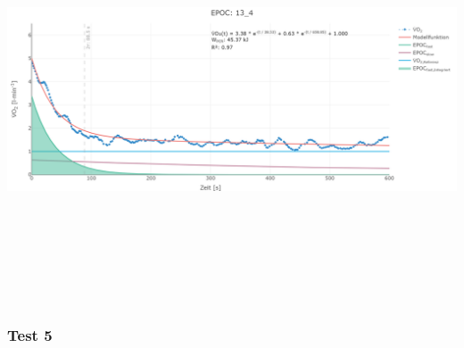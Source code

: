 \documentclass[
  letterpaper,
  DIV=11]{scrartcl}
\begin{document}
\includegraphics[width=11.45833in,height=4.6875in]{images/13_4.png}

\subsubsection{Test 5}
\end{document}
